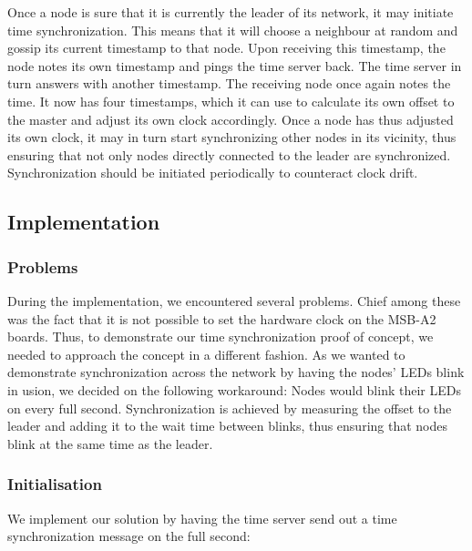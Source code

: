 \documentclass[11pt,
  a4paper,
  ngerman,
  BCOR=7mm
]{scrartcl}
\begin{document}
Once a node is sure that it is currently the leader of its network, it
may initiate time synchronization. This means that it will choose
a neighbour at random and gossip its current timestamp to that node.
Upon receiving this timestamp, the node notes its own timestamp and
pings the time server back. The time server in turn answers with another
timestamp. The receiving node once again notes the time. It now has four
timestamps, which it can use to calculate its own offset to the master
and adjust its own clock accordingly. Once a node has thus adjusted its
own clock, it may in turn start synchronizing other nodes in its
vicinity, thus ensuring that not only nodes directly connected to the
leader are synchronized. Synchronization should be initiated
periodically to counteract clock drift.

\subsection*{Implementation}
\label{sub:implementation_time_synchronization}

\subsubsection*{Problems}
\label{ssub:timesync_problems}
During the implementation, we encountered several problems. Chief among
these was the fact that it is not possible to set the hardware clock on
the MSB-A2 boards. Thus, to demonstrate our time synchronization proof
of concept, we needed to approach the concept in a different fashion. As
we wanted to demonstrate synchronization across the network by having
the nodes' LEDs blink in usion, we decided on the following workaround:
Nodes would blink their LEDs on every full second. Synchronization is
achieved by measuring the offset to the leader and adding it to the wait
time between blinks, thus ensuring that nodes blink at the same time as
the leader.

\newpage

\subsubsection*{Initialisation}
\label{ssub:timesync_initialisation}
We implement our solution by having the time server send out a time
synchronization message on the full second:
\end{document}
